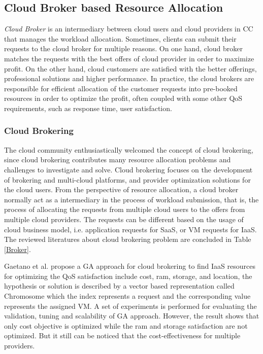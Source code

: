 \documentclass[onecolumn,10pt]{asme2ej}
\begin{document}
\subsection{Cloud Broker based Resource Allocation}
\emph{Cloud Broker} is an intermediary between cloud users and cloud providers in CC that manages the workload allocation. Sometimes, clients can submit their requests to the cloud broker for multiple reasons. On one hand, cloud broker matches the requests with the best offers of cloud provider in order to maximize profit. On the other hand, cloud customers are satisfied with the better offerings, professional solutions and higher performance. In practice, the cloud brokers are responsible for efficient allocation of the customer requests into pre-booked resources in order to optimize the profit, often coupled with some other QoS requirements, such as response time, user satisfaction.

\subsubsection{Cloud Brokering}
The cloud community enthusiastically welcomed the concept of cloud brokering, since cloud brokering contributes many resource allocation problems and challenges to investigate and solve. Cloud brokering focuses on the development of brokering and multi-cloud platforms, and provider optimization solutions for the cloud users. From the perspective of resource allocation, a cloud broker normally act as a intermediary in the process of workload submission, that is, the process of allocating the requests from multiple cloud users to the offers from multiple cloud providers. The requests can be different based on the usage of cloud business model, i.e. application requests for SaaS, or VM requests for IaaS. The reviewed literatures about cloud brokering problem are concluded in Table \ref{Broker}. 

Gaetano et al. \cite{anastasi2014qbrokage} propose a GA approach for cloud brokering to find IaaS resources for optimizing the QoS satisfaction include cost, ram, storage, and location, the hypothesis or solution is described by a vector based representation called Chromosome which the index represents a request and the corresponding value represents the assigned VM. A set of experiments is performed for evaluating the validation, tuning and scalability of GA approach. However, the result shows that only cost objective is optimized while the ram and storage satisfaction are not optimized. But it still can be noticed that the cost-effectiveness for multiple providers. 
\end{document}
